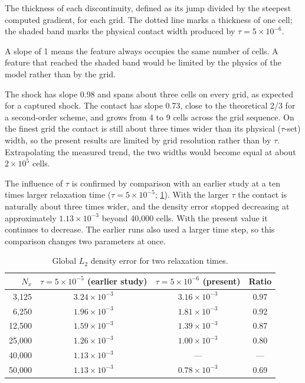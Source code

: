 \documentclass[11pt]{article}
\begin{document}
\begin{figexplain}{}
\begin{fx}
\item[What is shown.] The thickness of each discontinuity, defined as its jump divided by the
  steepest computed gradient, for each grid.  The dotted line marks a thickness of one cell;
  the shaded band marks the physical contact width produced by $\tau = 5\times10^{-6}$.
\item[How to read it.] A slope of 1 means the feature always occupies the same number of
  cells.  A feature that reached the shaded band would be limited by the physics of the
  model rather than by the grid.
\item[What it means.] The shock has slope 0.98 and spans about three cells on every grid, as
  expected for a captured shock.  The contact has slope 0.73, close to the theoretical 2/3
  for a second-order scheme, and grows from 4 to 9 cells across the grid sequence.  On the
  finest grid the contact is still about three times wider than its physical ($\tau$-set)
  width, so the present results are limited by grid resolution rather than by $\tau$.
  Extrapolating the measured trend, the two widths would become equal at about
  $2\times10^{5}$ cells.
\end{fx}
\end{figexplain}

The influence of $\tau$ is confirmed by comparison with an earlier study at a ten times
larger relaxation time ($\tau = 5\times10^{-5}$; \cref{tab:tau}).  With the larger $\tau$ the
contact is naturally about three times wider, and the density error stopped decreasing
at approximately $1.13\times10^{-3}$ beyond 40{,}000 cells.  With the present value it
continues to decrease.  The earlier runs also used a larger time step, so this comparison
changes two parameters at once.

\begin{table}[H]
\centering
\caption{Global $L_2$ density error for two relaxation times.}
\label{tab:tau}
\small
\begin{tabular}{@{}rccc@{}}
\toprule
$N_x$ & $\tau = 5\times10^{-5}$ (earlier study) & $\tau = 5\times10^{-6}$ (present) & Ratio \\
\midrule
3,125  & $3.24\times10^{-3}$ & $3.16\times10^{-3}$ & 0.97 \\
6,250  & $1.96\times10^{-3}$ & $1.81\times10^{-3}$ & 0.92 \\
12,500 & $1.59\times10^{-3}$ & $1.39\times10^{-3}$ & 0.87 \\
25,000 & $1.26\times10^{-3}$ & $1.00\times10^{-3}$ & 0.80 \\
40,000 & $1.13\times10^{-3}$ & --- & --- \\
50,000 & $1.13\times10^{-3}$ & $0.78\times10^{-3}$ & 0.69 \\
\bottomrule
\end{tabular}
\end{table}
\end{document}
